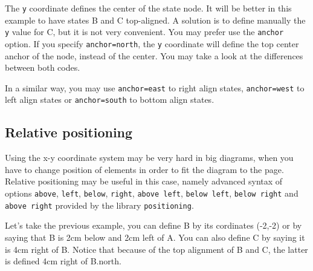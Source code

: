 \documentclass[a4paper,11pt]{report}
\begin{document}
\medskip

The {\tt y} coordinate defines the center of the state node. It will be better in this example to have states B and C top-aligned. A solution is to define manually the {\tt y} value for C, but it is not very convenient. You may prefer use the {\tt anchor} option. If you specify {\tt anchor=north}, the {\tt y} coordinate will define the top center anchor of the node, instead of the center. You may take a look at the differences between both codes.

\medskip

\begin{minipage}{0.5\textwidth}
	
\end{minipage}
\begin{minipage}{0.5\textwidth}
	\begin{center}
	\end{center}
\end{minipage}

\medskip

In a similar way, you may use {\tt anchor=east} to right align states, {\tt anchor=west} to left align states or {\tt anchor=south} to bottom align states.

\subsection{Relative positioning}\label{ss.stdiagrelpos}

Using the x-y coordinate system may be very hard in big diagrams, when you have to change position of elements in order to fit the diagram to the page. Relative positioning may be useful in this case, namely advanced syntax of options {\tt above}, {\tt left}, {\tt below}, {\tt right}, {\tt above left}, {\tt below left}, {\tt below right} and {\tt above right} provided by the \TikZ library {\tt positioning}.

\medskip

Let's take the previous example, you can define B by its cordinates (-2,-2) or by saying that B is 2cm below and 2cm left of A. You can also define C by saying it is 4cm right of B. Notice that because of the top alignment of B and C, the latter is defined 4cm right of B.north.

\medskip

\begin{minipage}{0.5\textwidth}
	
\end{minipage}
\begin{minipage}{0.5\textwidth}
	\begin{center}
	\end{center}
\end{minipage}
\end{document}
